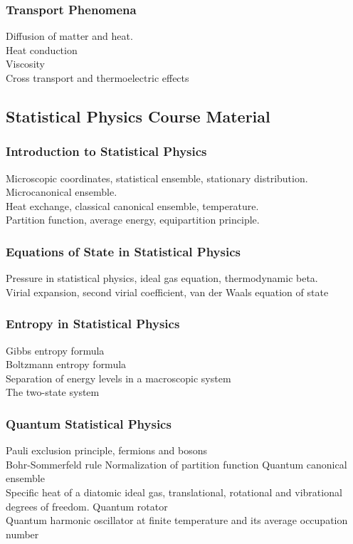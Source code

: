 \documentclass[11pt, a4paper]{article}
\begin{document}
\subsubsection{Transport Phenomena}
Diffusion of matter and heat.\\
Heat conduction\\
Viscosity\\
Cross transport and thermoelectric effects


\subsection{Statistical Physics Course Material}

\subsubsection{Introduction to Statistical Physics}
Microscopic coordinates, statistical ensemble, stationary distribution.\\
Microcanonical ensemble.\\
Heat exchange, classical canonical ensemble, temperature.\\
Partition function, average energy, equipartition principle.

\subsubsection{Equations of State in Statistical Physics}
Pressure in statistical physics, ideal gas equation, thermodynamic beta.\\
Virial expansion, second virial coefficient, van der Waals equation of state

\subsubsection{Entropy in Statistical Physics}
Gibbs entropy formula\\
Boltzmann entropy formula\\
Separation of energy levels in a macroscopic system\\
The two-state system

\subsubsection{Quantum Statistical Physics}
Pauli exclusion principle, fermions and bosons\\
Bohr-Sommerfeld rule
Normalization of partition function
Quantum canonical ensemble\\
Specific heat of a diatomic ideal gas, translational, rotational and vibrational degrees of freedom.
Quantum rotator\\
Quantum harmonic oscillator at finite temperature and its average occupation number
\end{document}

